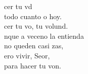 \begin{cancion}%
	cer tu vd \\
	 todo cuanto o hoy.\\
	cer tu vo, tu volund.\\
	nque a veceno la entienda\\
	no queden casi zas,\\
	ero vivir, Seor,\\
	para hacer tu von.\\
\end{cancion}%
